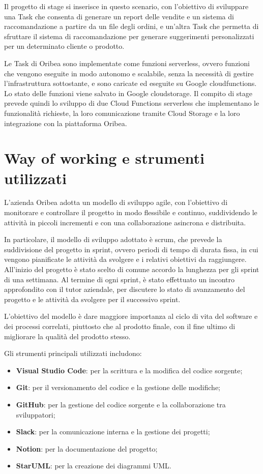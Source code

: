 Il progetto di stage si inserisce in questo scenario, con l'obiettivo di sviluppare una Task che consenta di generare un report delle vendite e un sistema di raccomandazione a partire da un file degli ordini, e un’altra Task che permetta di sfruttare il sistema di raccomandazione per generare suggerimenti personalizzati per un determinato cliente o prodotto.

Le Task di Oribea sono implementate come funzioni serverless, ovvero funzioni che vengono eseguite in modo autonomo e scalabile, senza la necessità di gestire l'infrastruttura sottostante, e sono caricate ed eseguite su Google \gls{cloudfunctions}\glsfirstoccur{}. Lo stato delle funzioni viene salvato in Google \gls{cloudstorage}\glsfirstoccur{}. Il compito di stage prevede quindi lo sviluppo di due Cloud Functions serverless che implementano le funzionalità richieste, la loro comunicazione tramite Cloud Storage e la loro integrazione con la piattaforma Oribea.


\section{Way of working e strumenti utilizzati}
\label{sec:way-of-working}

L’azienda Oribea adotta un modello di sviluppo \gls{agile}\glsfirstoccur{}, con l’obiettivo di monitorare e controllare il progetto in modo flessibile e continuo, suddividendo le attività in piccoli incrementi e con una collaborazione asincrona e distribuita.

In particolare, il modello di sviluppo adottato è \gls{scrum}\glsfirstoccur{}, che prevede la suddivisione del progetto in sprint, ovvero periodi di tempo di durata fissa, in cui vengono pianificate le attività da svolgere e i relativi obiettivi da raggiungere. All'inizio del progetto è stato scelto di comune accordo la lunghezza per gli sprint di una settimana. Al termine di ogni sprint, è stato effettuato un incontro approfondito con il tutor aziendale, per discutere lo stato di avanzamento del progetto e le attività da svolgere per il successivo sprint.

L’obiettivo del modello è dare maggiore importanza al ciclo di vita del software e dei processi correlati, piuttosto che al prodotto finale, con il fine ultimo di migliorare la qualità del prodotto stesso.

Gli strumenti principali utilizzati includono:
\begin{itemize}
    \item \textbf{Visual Studio Code}: per la scrittura e la modifica del codice sorgente;
    \item \textbf{Git}: per il versionamento del codice e la gestione delle modifiche;
    \item \textbf{GitHub}: per la gestione del codice sorgente e la collaborazione tra sviluppatori;
    \item \textbf{Slack}: per la comunicazione interna e la gestione dei progetti;
    \item \textbf{Notion}: per la documentazione del progetto;
    \item \textbf{StarUML}: per la creazione dei diagrammi UML.
\end{itemize}

